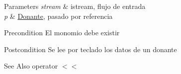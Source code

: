 \begin{DoxyParams}{Parameters}
{\em stream} & istream, flujo de entrada \\
\hline
{\em p} & \hyperlink{classed_1_1Donante}{Donante}, pasado por referencia \\
\hline
\end{DoxyParams}
\begin{DoxyPrecond}{Precondition}
El monomio debe existir 
\end{DoxyPrecond}
\begin{DoxyPostcond}{Postcondition}
Se lee por teclado los datos de un donante 
\end{DoxyPostcond}
\begin{DoxySeeAlso}{See Also}
operator $<$$<$ 
\end{DoxySeeAlso}
